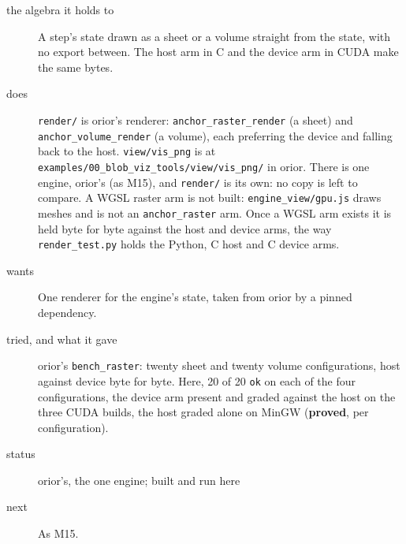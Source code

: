 \begin{description}
\item[{the algebra it holds to}] A step's state drawn as a sheet or a volume straight from the state, with no export between. The host arm in C and the device arm in CUDA make the same bytes.
\item[{does}] \texttt{render/\allowbreak{}} is orior's renderer: \texttt{anchor\_\allowbreak{}raster\_\allowbreak{}render} (a sheet) and \texttt{anchor\_\allowbreak{}volume\_\allowbreak{}render} (a volume), each preferring the device and falling back to the host. \texttt{view/\allowbreak{}vis\_\allowbreak{}png} is at \texttt{examples/\allowbreak{}00\_\allowbreak{}blob\_\allowbreak{}viz\_\allowbreak{}tools/\allowbreak{}view/\allowbreak{}vis\_\allowbreak{}png/\allowbreak{}} in orior. There is one engine, orior's (as M15), and \texttt{render/\allowbreak{}} is its own: no copy is left to compare. A WGSL raster arm is not built: \texttt{engine\_\allowbreak{}view/\allowbreak{}gpu.\allowbreak{}js} draws meshes and is not an \texttt{anchor\_\allowbreak{}raster} arm. Once a WGSL arm exists it is held byte for byte against the host and device arms, the way \texttt{render\_\allowbreak{}test.\allowbreak{}py} holds the Python, C host and C device arms.
\item[{wants}] One renderer for the engine's state, taken from orior by a pinned dependency.
\item[{tried, and what it gave}] orior's \texttt{bench\_\allowbreak{}raster}: twenty sheet and twenty volume configurations, host against device byte for byte. Here, 20 of 20 \texttt{ok} on each of the four configurations, the device arm present and graded against the host on the three CUDA builds, the host graded alone on MinGW (\textbf{proved}, per configuration).
\item[{status}] orior's, the one engine; built and run here
\item[{next}] As M15.
\end{description}

